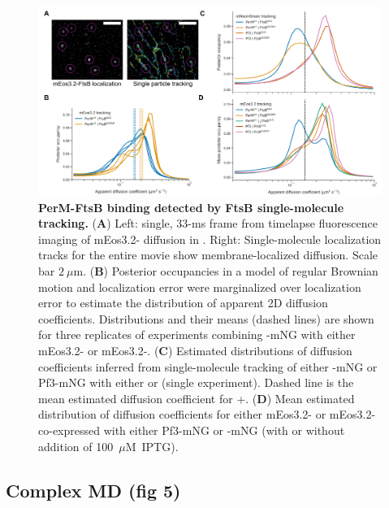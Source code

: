 \documentclass[pdflatex,sn-basic]{sn-jnl}%
\begin{document}
\begin{figure}[h]
\centering
\includegraphics[width=1.0\textwidth]{../figures/fig4.png}
\caption{\textbf{PerM-FtsB binding detected by FtsB single-molecule tracking.} (\textbf{A}) Left: single, 33-ms frame from timelapse fluorescence imaging of mEos3.2-\ftsbdLQ{} diffusion in \ec{}. Right: Single-molecule localization tracks for the entire movie show membrane-localized diffusion. Scale bar $2~\mu$m. (\textbf{B}) Posterior occupancies in a model of regular Brownian motion and localization error were marginalized over localization error to estimate the distribution of apparent 2D diffusion coefficients. Distributions and their means (dashed lines) are shown for three replicates of experiments combining \permN{}-mNG with either mEos3.2-\ftsbdLQ{} or mEos3.2-\ftsbdLQdH{}. (\textbf{C}) Estimated distributions of diffusion coefficients inferred from single-molecule tracking of either \permN{}-mNG or Pf3-mNG with either \ftsbdLQ{} or \ftsbdLQdH{} (single experiment). Dashed line is the mean estimated diffusion coefficient for \permN{}+\ftsbdLQ{}. (\textbf{D}) Mean estimated distribution of diffusion coefficients for either mEos3.2-\ftsbdLQ{} or mEos3.2-\ftsbdLQdH{} co-expressed with either Pf3-mNG or \permN{}-mNG (with or without addition of 100~$\mu$M~IPTG).}\label{fig4}
\end{figure}

\subsection{Complex MD (fig 5)}

\loremipsum{}

\end{document}

